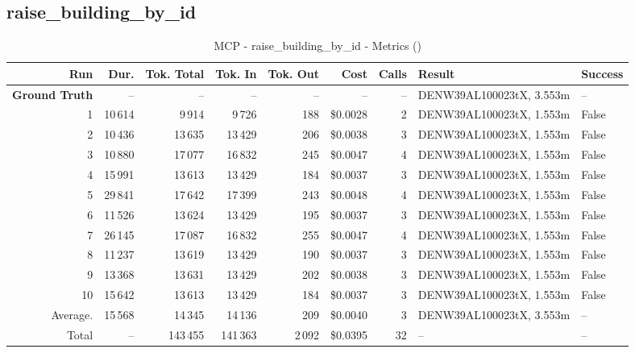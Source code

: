 \documentclass[a4paper,11pt]{article}
\begin{document}
\clearpage
\subsection{raise\_building\_by\_id}

\begin{table}[ht]
\centering
\scriptsize
\caption{MCP - raise\_building\_by\_id - Metrics ()}
\label{tab:mcp\_raise\_building\_by\_id\_metrics\_}
\begin{tabular}{r r r r r r r p{3cm} l}
\hline
Run & Dur. & Tok. Total & Tok. In & Tok. Out & Cost & Calls & Result & Success \\
\hline
\textbf{Ground Truth} & -- & -- & -- & -- & -- & -- & DENW39AL100023tX, 3.553m & -- \\
\hline
1 & 10\,614 & 9\,914 & 9\,726 & 188 & \$0.0028 & 2 & DENW39AL100023tX, 1.553m & False \\
2 & 10\,436 & 13\,635 & 13\,429 & 206 & \$0.0038 & 3 & DENW39AL100023tX, 1.553m & False \\
3 & 10\,880 & 17\,077 & 16\,832 & 245 & \$0.0047 & 4 & DENW39AL100023tX, 1.553m & False \\
4 & 15\,991 & 13\,613 & 13\,429 & 184 & \$0.0037 & 3 & DENW39AL100023tX, 1.553m & False \\
5 & 29\,841 & 17\,642 & 17\,399 & 243 & \$0.0048 & 4 & DENW39AL100023tX, 1.553m & False \\
6 & 11\,526 & 13\,624 & 13\,429 & 195 & \$0.0037 & 3 & DENW39AL100023tX, 1.553m & False \\
7 & 26\,145 & 17\,087 & 16\,832 & 255 & \$0.0047 & 4 & DENW39AL100023tX, 1.553m & False \\
8 & 11\,237 & 13\,619 & 13\,429 & 190 & \$0.0037 & 3 & DENW39AL100023tX, 1.553m & False \\
9 & 13\,368 & 13\,631 & 13\,429 & 202 & \$0.0038 & 3 & DENW39AL100023tX, 1.553m & False \\
10 & 15\,642 & 13\,613 & 13\,429 & 184 & \$0.0037 & 3 & DENW39AL100023tX, 1.553m & False \\
\hline
Average. & 15\,568 & 14\,345 & 14\,136 & 209 & \$0.0040 & 3 & DENW39AL100023tX, 3.553m & -- \\
Total & -- & 143\,455 & 141\,363 & 2\,092 & \$0.0395 & 32 & -- & -- \\
\hline
\end{tabular}
\end{table}

\clearpage
\end{document}
